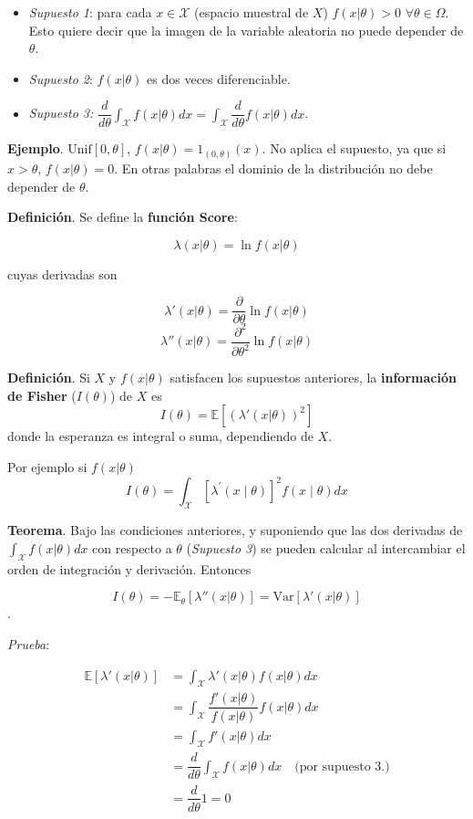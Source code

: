 \documentclass[
  12pt,
]{book}
\begin{document}
\begin{itemize}
\item
  \emph{Supuesto 1}: para cada \(x \in \mathcal X\) (espacio muestral de \(X\)) \(f(x|\theta)> 0\) \(\forall \theta \in \Omega\). Esto quiere decir que la imagen de la variable aleatoria no puede depender de \(\theta\).
\item
  \emph{Supuesto 2}: \(f(x|\theta)\) es dos veces diferenciable.
\item
  \emph{Supuesto 3:} \(\dfrac d{d\theta}\int_{\mathcal X}f(x|\theta)dx = \int_{\mathcal X}\dfrac d{d\theta}f(x|\theta)dx\).
\end{itemize}

\textbf{Ejemplo}. \(\text{Unif}[0,\theta]\), \(f(x|\theta) = 1_{(0,\theta)}(x)\). No
aplica el supuesto, ya que si \(x>\theta\), \(f(x|\theta) = 0\). En otras palabras
el dominio de la distribución no debe depender de \(\theta\).

\textbf{Definición}. Se define la \textbf{función Score}:

\[\lambda(x|\theta)=\ln f(x|\theta)\]

cuyas derivadas son

\[\lambda'(x|\theta) = \dfrac \partial{\partial \theta}\ln f(x|\theta)\]
\[\lambda''(x|\theta) = \dfrac {\partial^2}{\partial \theta^2}\ln f(x|\theta)\]

\textbf{Definición}. Si \(X\) y \(f(x|\theta)\) satisfacen los supuestos anteriores, la \textbf{información de Fisher} (\(I(\theta)\)) de \(X\) es
\[I(\theta) =\mathbb E[(\lambda'(x|\theta))^2]\]
donde la esperanza es integral o suma, dependiendo de \(X\).

Por ejemplo si \(f(x\vert\theta)\)
\begin{equation}
I(\theta)=\int_{\mathcal{X}}\left[\lambda^{\prime}(x \mid \theta)\right]^{2} f(x \mid \theta) d x
\end{equation}

\textbf{Teorema}. Bajo las condiciones anteriores, y suponiendo que las dos derivadas
de \(\int_{\mathcal X}f(x|\theta)dx\) con respecto a \(\theta\) (\emph{Supuesto 3}) se
pueden calcular al intercambiar el orden de integración y derivación. Entonces

\[I(\theta) = -\mathbb E_{\theta}[\lambda''(x|\theta)] = \text{Var}[\lambda'(x|\theta)]\].

\emph{Prueba}:

\begin{align*}
	\mathbb E[\lambda'(x|\theta)]
  & = \int_{\mathcal X}\lambda'(x|\theta)f(x|\theta)dx                                            \\
  & = \int_{\mathcal X} \dfrac{f'(x|\theta)}{f(x|\theta)}f(x|\theta)dx                            \\
  & =  \int_{\mathcal X}f'(x|\theta)dx                                                            \\
  & = \dfrac d{d\theta}\int_{\mathcal X}f(x|\theta)dx \quad \text{(por supuesto 3.)} \\
  & = \dfrac d{d\theta}1 = 0
\end{align*}
\end{document}
